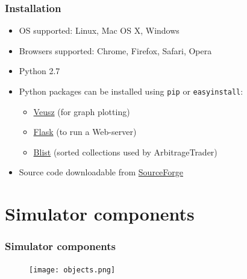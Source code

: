 \documentclass{beamer}
\begin{document}
\begin{frame}
\frametitle{Installation}
\begin{itemize}
\item OS supported: Linux, Mac OS X, Windows
\item Browsers supported: Chrome, Firefox, Safari, Opera
\item Python 2.7
\item Python packages can be installed using \texttt{pip} or \texttt{easyinstall}:
\begin{itemize}
\item \textcolor[rgb]{0.00,0.50,0.75}{\href{http://home.gna.org/veusz/}{Veusz}} (for graph plotting)
\item \textcolor[rgb]{0.00,0.50,0.75}{\href{http://flask.pocoo.org}{Flask}} (to run a Web-server)
\item \textcolor[rgb]{0.00,0.50,0.75}{\href{https://pypi.python.org/pypi/blist/}{Blist}} (sorted collections used by ArbitrageTrader)
\end{itemize}
\item Source code downloadable from \textcolor[rgb]{0.00,0.50,0.75}{\href{http://sourceforge.net/p/marketsimulator/svn/HEAD/tree/DevAnton/v3/}{SourceForge}}
\end{itemize}

\end{frame}

\section{Simulator components}

\begin{frame}
\frametitle{Simulator components}
\begin{figure}[htbp]
\centering
\texttt{[image: objects.png]}
\end{figure}
\end{frame}
\end{document}
